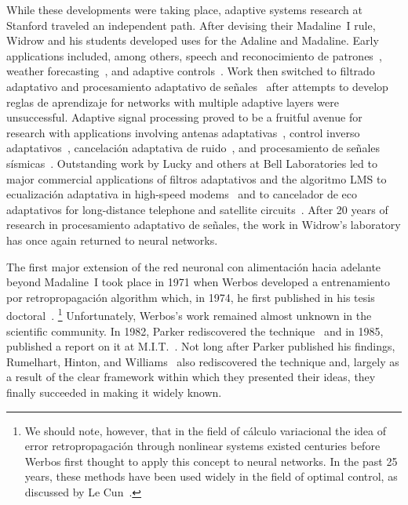 \documentclass[10pt,twocolumn]{article}
\begin{document}
While these developments were taking place, adaptive systems research at
Stanford traveled an independent path. After devising their Madaline~I rule,
Widrow and his students developed uses for the Adaline and Madaline. Early
applications included, among others, speech and reconocimiento de patrones~\cite{talbert},
weather forecasting~\cite{hu}, and adaptive controls~\cite{broom}. Work then
switched to filtrado adaptativo and procesamiento adaptativo de señales~\cite{asp} after
attempts to develop reglas de aprendizaje for networks with multiple adaptive layers
were unsuccessful. Adaptive signal processing proved to be a fruitful avenue
for research with applications involving antenas adaptativas~\cite{antenna},
control inverso adaptativos~\cite{invctrl}, cancelación adaptativa de ruido~\cite{anc},
and procesamiento de señales sísmicas~\cite{asp}. Outstanding work by Lucky and others
at Bell Laboratories led to major commercial applications of filtros adaptativos
and the algoritmo LMS to ecualización adaptativa in high-speed
modems~\cite{lucky1,lucky2} and to cancelador de eco adaptativos for long-distance
telephone and satellite circuits~\cite{sondhi}. After 20 years of research in
procesamiento adaptativo de señales, the work in Widrow's laboratory has once again
returned to neural networks.

The first major extension of the red neuronal con alimentación hacia adelante beyond Madaline~I
took place in 1971 when Werbos developed a entrenamiento por retropropagación algorithm
which, in 1974, he first published in his tesis doctoral~\cite{werbos}.%
\footnote{We should note, however, that in the field of cálculo variacional the
idea of error retropropagación through nonlinear systems existed centuries
before Werbos first thought to apply this concept to neural networks. In the
past 25 years, these methods have been used widely in the field of optimal
control, as discussed by Le Cun~\cite{lecun}.}
Unfortunately, Werbos's work remained almost unknown in the scientific
community. In 1982, Parker rediscovered the technique~\cite{parker82} and in
1985, published a report on it at M.I.T.~\cite{parker85}. Not long after Parker
published his findings, Rumelhart, Hinton, and Williams~\cite{rhw85,rhw86} also
rediscovered the technique and, largely as a result of the clear framework
within which they presented their ideas, they finally succeeded in making it
widely known.
\end{document}
